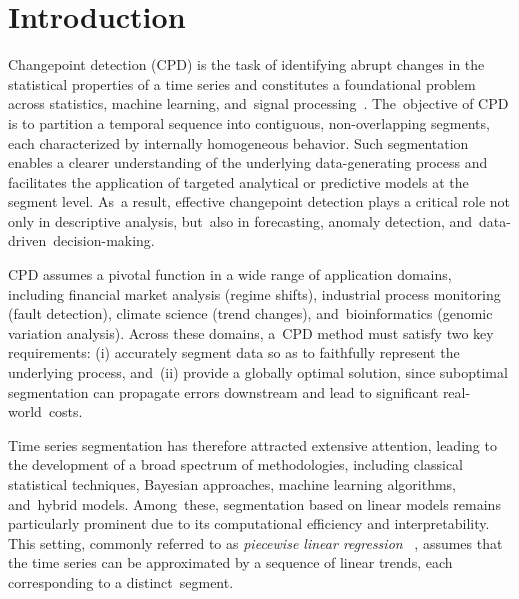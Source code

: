 \documentclass[mathematics,article,accept,pdftex,moreauthors]{Definitions/mdpi}
\begin{document}
\section{Introduction} %
\label{sec:intro}

Changepoint detection (CPD) is the task of identifying abrupt changes in the statistical properties of a time series and constitutes a foundational problem across statistics, machine learning, and~signal processing~\cite{LMS14,AC17,TOV20}. The~objective of CPD is to partition a temporal sequence into contiguous, non-overlapping segments, each characterized by internally homogeneous behavior. Such segmentation enables a clearer understanding of the underlying data-generating process and facilitates the application of targeted analytical or predictive models at the segment level. As~a result, effective changepoint detection plays a critical role not only in descriptive analysis, but~also in forecasting, anomaly detection, and~data-driven~decision-making.

CPD assumes a pivotal function in a wide range of application domains, including financial market analysis (regime shifts), industrial process monitoring (fault detection), climate science (trend changes), and~bioinformatics (genomic variation analysis). Across these domains, a~CPD method must satisfy two key requirements: (i) accurately segment data so as to faithfully represent the underlying process, and~(ii) provide a globally optimal solution, since suboptimal segmentation can propagate errors downstream and lead to significant real-world~costs.

Time series segmentation has therefore attracted extensive attention, leading to the development of a broad spectrum of methodologies, including classical statistical techniques, Bayesian approaches, machine learning algorithms, and~hybrid models. Among~these, segmentation based on linear models remains particularly prominent due to its computational efficiency and interpretability. This setting, commonly referred to as {\it piecewise linear regression}%
~\cite{KCHP02}, assumes that the time series can be approximated by a sequence of linear trends, each corresponding to a distinct~segment. 
\end{document}
